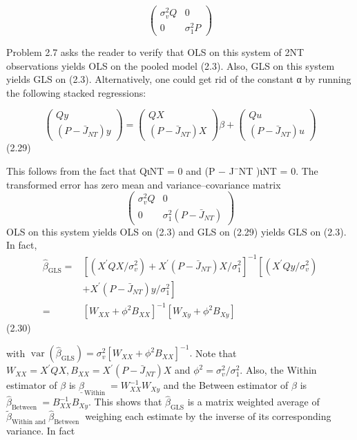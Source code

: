 \documentclass[
]{book}
\begin{document}
\[
\left(\begin{array}{cc}
\sigma_{v}^{2} Q & 0 \\
0 & \sigma_{1}^{2} P
\end{array}\right)
\]

Problem 2.7 asks the reader to verify that OLS on this system of 2NT observations yields OLS on the pooled model (2.3). Also, GLS on this system yields GLS on (2.3). Alternatively, one could get rid of the constant α by running the following stacked regressions:

\begin{equation}
\left(\begin{array}{c}
Q y \\
\left(P-\bar{J}_{N T}\right) y
\end{array}\right)=\left(\begin{array}{c}
Q X \\
\left(P-\bar{J}_{N T}\right) X
\end{array}\right) \beta+\left(\begin{array}{c}
Q u \\
\left(P-\bar{J}_{N T}\right) u
\end{array}\right)
\end{equation} (2.29)

This follows from the fact that QιNT = 0 and (P − J¯NT )ιNT = 0. The transformed error has zero mean and variance--covariance matrix \[
\left(\begin{array}{cc}
\sigma_{v}^{2} Q & 0 \\
0 & \sigma_{1}^{2}\left(P-\bar{J}_{N T}\right)
\end{array}\right)
\] OLS on this system yields OLS on (2.3) and GLS on (2.29) yields GLS on (2.3). In fact, \begin{equation}
\begin{aligned}
\widehat{\beta}_{\mathrm{GLS}}=&\left[\left(X^{\prime} Q X / \sigma_{v}^{2}\right)+X^{\prime}\left(P-\bar{J}_{N T}\right) X / \sigma_{1}^{2}\right]^{-1}\left[\left(X^{\prime} Q y / \sigma_{v}^{2}\right)\right.\\
&\left.+X^{\prime}\left(P-\bar{J}_{N T}\right) y / \sigma_{1}^{2}\right] \\
=&\left[W_{X X}+\phi^{2} B_{X X}\right]^{-1}\left[W_{X y}+\phi^{2} B_{X y}\right]
\end{aligned}
\end{equation} (2.30)

with \(\operatorname{var}\left(\widehat{\beta}_{\mathrm{GLS}}\right)=\sigma_{v}^{2}\left[W_{X X}+\phi^{2} B_{X X}\right]^{-1} .\) Note that \(W_{X X}=X^{\prime} Q X, B_{X X}=X^{\prime}\left(P-\bar{J}_{N T}\right) X\) and \(\phi^{2}=\sigma_{v}^{2} / \sigma_{1}^{2}\). Also, the Within estimator of \(\beta\) is \(\underline{\beta}_{\text {Within }}=W_{X X}^{-1} W_{X y}\) and the Between estimator of \(\beta\) is \(\widehat{\beta}_{\text {Between }}=B_{X X}^{-1} B_{X y} .\) This shows that \(\widehat{\beta}_{\mathrm{GLS}}\) is a matrix weighted average of \(\widetilde{\beta}_{\text {Within and }} \widehat{\beta}_{\text {Between }}\) weighing each estimate by the inverse of its corresponding variance. In fact
\end{document}
